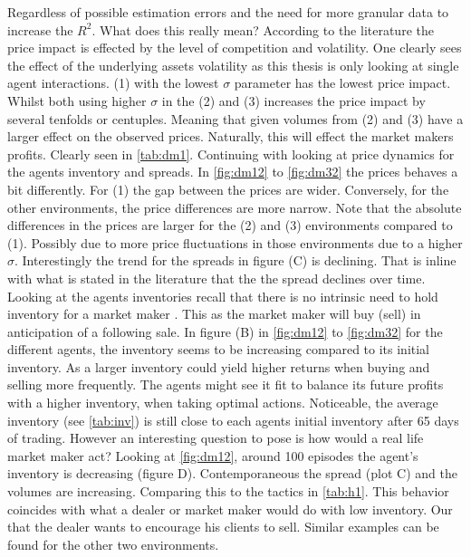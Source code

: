 \documentclass{kththesis}
\theoremstyle{definition}
\begin{document}
 \newpage
 Regardless of possible estimation errors and the need for more granular data to increase the $R^{2}$. What does this really mean? According to the literature \parencite{cartea2015algorithmic, foucault2013market} the price impact is effected by the level of competition and volatility. One clearly sees the effect of the underlying assets volatility as this thesis is only looking at single agent interactions. (1) with the lowest $\sigma$ parameter has the lowest price impact. Whilst both using higher $\sigma$ in the (2) and (3) increases the price impact by several tenfolds or centuples. Meaning that given volumes from (2) and (3) have a larger effect on the observed prices. Naturally, this will effect the market makers profits. Clearly seen in \autoref{tab:dm1}.  
\newline
\newline
Continuing with looking at price dynamics for the agents inventory and spreads.  In \autoref{fig:dm12} to \autoref{fig:dm32} the prices behaves a bit differently. For (1) the gap between the prices are wider. Conversely, for the other environments, the price differences are more narrow. Note that the absolute differences in the prices are larger for the (2) and (3) environments compared to (1). Possibly due to more price fluctuations in those environments due to a higher $\sigma$. Interestingly the trend for the spreads in figure (C) is declining. That is inline with what is stated in the literature \parencite{bouchaud2018trades, hasbrouck2007empirical, madhavan2000market} that the the spread declines over time. Looking at the agents inventories recall that there is no intrinsic need to hold inventory for a market maker \parencite{cartea2015algorithmic}. This as the market maker will buy (sell) in anticipation of a following sale. In figure (B) in \autoref{fig:dm12} to \autoref{fig:dm32} for the different agents, the inventory seems to be increasing compared to its initial inventory. 
\newline
\newline
As a larger inventory could yield higher returns when buying and selling more frequently. The agents might see it fit to balance its future profits with a higher inventory, when taking optimal actions. 
Noticeable, the average inventory (see \autoref{tab:inv}) is still close to each agents initial inventory after 65 days of trading. However an interesting question to pose is how would a real life market maker act? Looking at \autoref{fig:dm12}, around 100 episodes the agent's inventory is decreasing (figure D). Contemporaneous the spread (plot C) and the volumes are increasing. Comparing this to the tactics in \autoref{tab:h1}. This behavior coincides with what a dealer or market maker would do with low inventory. Our that the dealer wants to encourage his clients to sell. Similar examples can be found for the other two environments. 
\end{document}
